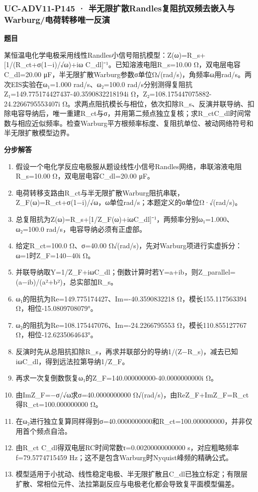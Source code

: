 \documentclass[UTF8,11pt,a4paper]{ctexart}
\begin{document}
\subsubsection*{UC-ADV11-P145 · 半无限扩散Randles复阻抗双频去嵌入与Warburg/电荷转移唯一反演}
\noindent\textbf{题目}\par
某恒温电化学电极采用线性Randles小信号阻抗模型：Z(ω)=R\_s+[1/(R\_ct+σ(1−i)/√ω)+iω C\_dl]⁻¹。已知溶液电阻R\_s=10.00 Ω，双电层电容C\_dl=20.00 μF，半无限扩散Warburg参数σ单位Ω√(rad/s)，角频率ω用rad/s。两次EIS实验在ω₁=1.000 rad/s、ω₂=100.0 rad/s分别测得复阻抗Z₁=149.775174427437-40.3590832218194i Ω，Z₂=108.175447075882-24.2266795553407i Ω。求两点阻抗模长与相位，依次扣除R\_s、反演并联导纳、扣除电容导纳后，唯一重建R\_ct与σ，并用第二频点独立复核；求R\_ctC\_dl时间常数与相应近似频率。检查Warburg平方根频率标度、复阻抗单位、被动网络符号和半无限扩散模型边界。\par
\medskip\noindent\textbf{分步解答}
\begin{enumerate}
\item 假设一个电化学反应电极服从题设线性小信号Randles网络，串联溶液电阻R\_s=10.00 Ω，双电层电容C\_dl=20.00 μF。
\item 电荷转移支路由R\_ct与半无限扩散Warburg阻抗串联，Z\_F(ω)=R\_ct+σ(1−i)/√ω，ω单位rad/s；本题定义的σ单位Ω·√(rad/s)。
\item 总复阻抗为Z(ω)=R\_s+[1/Z\_F(ω)+iωC\_dl]⁻¹，两频率分别ω₁=1.000、ω₂=100.0 rad/s，电容导纳必须有正虚部。
\item 给定R\_ct=100.0 Ω、σ=40.00 Ω√(rad/s)，先对Warburg项进行实虚拆分：ω=1时Z\_F=140−40i Ω。
\item 并联导纳取Y=1/Z\_F+iωC\_dl；倒数计算时若Y=a+ib，则Z\_parallel=(a−ib)/(a²+b²)，总实部加R\_s。
\item ω₁的阻抗为Re=149.775174427、Im=-40.3590832218 Ω，模长155.117563394 Ω，相位-15.0809708079°。
\item ω₂的阻抗为Re=108.175447076、Im=-24.2266795553 Ω，模长110.855127767 Ω，相位-12.6235064643°。
\item 反演时先从总阻抗扣除R\_s，再求并联部分的导纳1/(Z−R\_s)，减去已知iωC\_dl，得到远法拉第导纳1/Z\_F。
\item 再求一次复倒数恢复ω₁的Z\_F=140.000000000-40.0000000000i Ω。
\item 由ImZ\_F=−σ/√ω求σ=40.0000000000 Ω√(rad/s)，由ReZ\_F+ImZ\_F=R\_ct得R\_ct=100.000000000 Ω。
\item 在ω₂进行独立复算同样得到σ=40.0000000000和R\_ct=100.000000000，并非仅用首个频点自洽。
\item 由R\_ct C\_dl得双电层RC时间常数τ=0.00200000000000 s，对应粗略频率f=79.5774715459 Hz；这不是包含Warburg时Nyquist峰频的精确公式。
\item 模型适用于小扰动、线性稳定电极、半无限扩散且C\_dl已独立标定；有限层扩散、常相位元件、法拉第副反应与电极老化都会导致复平面模型偏差。
\end{enumerate}
\end{document}
